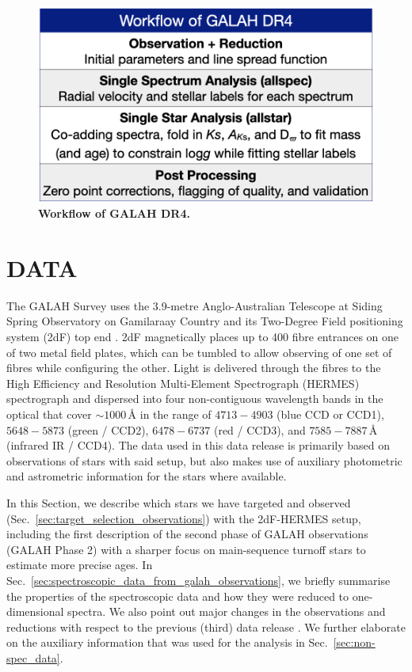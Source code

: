 \documentclass[
  journal=pasa,
  manuscript=research-paper, %
  year=2024,
  volume=37
]{cup-journal}
\begin{document}
\begin{figure}[ht]
 \centering
 \includegraphics[width=\textwidth]{figures/workflow_galah_dr4.png}
 \caption{\textbf{Workflow of GALAH DR4.}}
 \label{fig:workflow_galah_dr4}
\end{figure}

\section{DATA}
\label{sec:data}

The GALAH Survey uses the 3.9-metre Anglo-Australian Telescope at Siding Spring Observatory on Gamilaraay Country and its Two-Degree Field positioning system (2dF) top end \citep{Lewis2002}. 2dF magnetically places up to 400 fibre entrances on one of two metal field plates, which can be tumbled to allow observing of one set of fibres while configuring the other. Light is delivered through the fibres to the High Efficiency and Resolution Multi-Element Spectrograph (HERMES) spectrograph \citep{Barden2010, Brzeski2011, Heijmans2012, Farrell2014, Sheinis2015} and dispersed into four non-contiguous wavelength bands in the optical that cover $\sim 1000\,\text{\AA}$ in the range of $4713-4903$ (blue CCD or CCD1), $5648-5873$ (green / CCD2), $6478-6737$ (red / CCD3), and $7585-7887\,\text{\AA}$ (infrared IR / CCD4). The data used in this data release is primarily based on observations of stars with said setup, but also makes use of auxiliary photometric and astrometric information for the stars where available.

In this Section, we describe which stars we have targeted and observed (Sec.~\ref{sec:target_selection_observations}) with the 2dF-HERMES setup, including the first description of the second phase of GALAH observations (GALAH Phase 2) with a sharper focus on main-sequence turnoff stars to estimate more precise ages. In Sec.~\ref{sec:spectroscopic_data_from_galah_observations}, we briefly summarise the properties of the spectroscopic data and how they were reduced to one-dimensional spectra. We also point out major changes in the observations and reductions with respect to the previous (third) data release \citep{Buder2021}. We further elaborate on the auxiliary information that was used for the analysis in Sec.~\ref{sec:non-spec_data}.
\end{document}
